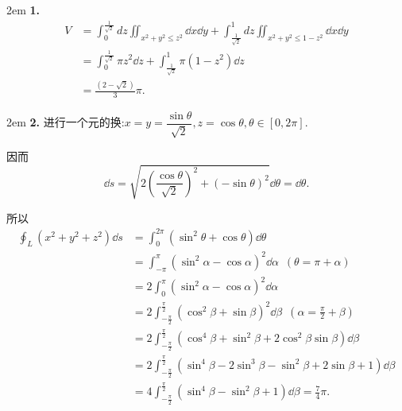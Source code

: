 \documentclass[UTF8,14pt,normal]{ctexart}
\begin{document}
    \hangindent 2em
    \noindent    
    \textbf{1.}
    \begin{equation*}
        \begin{split}
            V &= \int_{0}^{\frac{1}{\sqrt{2}}}dz\iint_{x^2+y^2\leqslant z^2}\dd x\dd y+\int_{\frac{1}{\sqrt{2}}}^{1}dz\iint_{x^2+y^2\leqslant 1-z^2}\dd x\dd y\\
            &= \int_{0}^{\frac{1}{\sqrt{2}}}\pi z^2\dd z+\int_{\frac{1}{\sqrt{2}}}^{1}\pi (1-z^2)\dd z\\
            &= \frac{(2-\sqrt{2})}{3}\pi.
        \end{split}
    \end{equation*}

    \hangindent 2em
    \noindent    
    \textbf{2.}
    进行一个元的换:\(x=y=\dfrac{\sin\theta}{\sqrt{2}},z = \cos\theta,\theta\in[0,2\pi]\).

    因而\[\dd s = \sqrt{2\left(\dfrac{\cos\theta}{\sqrt{2}}\right)^2+(-\sin \theta)^2}\dd\theta = \dd\theta.\]

    所以
    \begin{equation*}
        \begin{split}
            \oint_{L}(x^2+y^2+z^2)\dd s &= \int_{0}^{2\pi}(\sin^2\theta+\cos\theta)\dd \theta\\
            &= \int_{-\pi}^{\pi}(\sin^2\alpha-\cos\alpha)^2\dd \alpha\enspace(\theta = \pi+\alpha)\\
            &= 2\int_{0}^{\pi}(\sin^2\alpha-\cos\alpha)^2\dd \alpha\\
            &= 2\int_{-\frac{\pi}{2}}^{\frac{\pi}{2}}(\cos^2\beta+\sin\beta)^2\dd\beta\enspace(\alpha = \frac{\pi}{2}+\beta)\\
            &= 2\int_{-\frac{\pi}{2}}^{\frac{\pi}{2}}(\cos^4\beta+\sin^2\beta+2\cos^2\beta\sin\beta)\dd\beta\\
            &= 2\int_{-\frac{\pi}{2}}^{\frac{\pi}{2}}(\sin^4\beta-2\sin^3\beta-\sin^2\beta+2\sin\beta+1)\dd\beta\\
            &= 4\int_{-\frac{\pi}{2}}^{\frac{\pi}{2}}(\sin^4\beta-\sin^2\beta+1)\dd\beta = \frac{7}{4}\pi.
        \end{split}
    \end{equation*}
\end{document}
